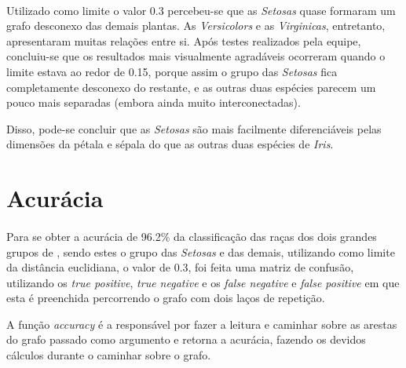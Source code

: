 \documentclass{article}
\begin{document}
        \paragraph{} Utilizado como limite o valor 0.3 percebeu-se que as {\it Setosas} quase formaram um grafo desconexo das demais plantas. As {\it Versicolors} e as {\it Virginicas}, entretanto, apresentaram muitas relações entre si. Após testes realizados pela equipe, concluiu-se que os resultados mais visualmente agradáveis ocorreram quando o limite estava ao redor de 0.15, porque assim o grupo das {\it Setosas} fica completamente desconexo do restante, e as outras duas espécies parecem um pouco mais separadas (embora ainda muito interconectadas).
		\par Disso, pode-se concluir que as {\it Setosas} são mais facilmente diferenciáveis pelas dimensões da pétala e sépala do que as outras duas espécies de {\it Iris}.

    \section{Acurácia}
        \paragraph{} Para se obter a acurácia de 96.2\% da classificação das raças dos dois grandes grupos de {}, sendo estes o grupo das {\it Setosas} e das demais, utilizando como limite da distância euclidiana, o valor de 0.3, foi feita uma matriz de confusão, utilizando os {\it true positive}, {\it true negative} e os {\it false negative} e {\it false positive} em que esta é preenchida percorrendo o grafo com dois laços de repetição.
        \par A função {\it accuracy} é a responsável por fazer a leitura e caminhar sobre as arestas do grafo passado como argumento e retorna a acurácia, fazendo os devidos cálculos durante o caminhar sobre o grafo.
\end{document}
